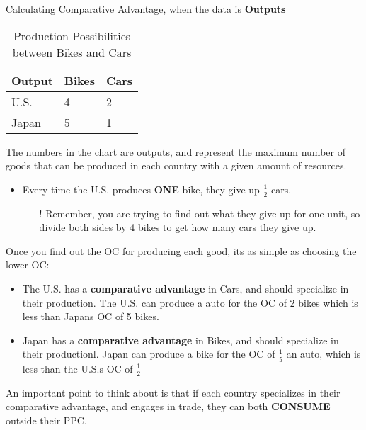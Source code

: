 \begin{example}
    Calculating Comparative Advantage, when the data is \textbf{Outputs}
    \begin{table}[h!]
        \begin{center}
            \begin{tabular}{l|l|l}
               \toprule
               \textbf{Output} & \textbf{Bikes} & \textbf{Cars}\\
               \midrule
               U.S. & 4 & 2\\
               Japan & 5 & 1\\
               \bottomrule
            \end{tabular}
            \caption{Production Possibilities between Bikes and Cars}
            \label{tab:table4}
        \end{center}
    \end{table}

The numbers in the chart are outputs, and represent the maximum number of goods that can be produced in each country with a given amount of resources. 
\begin{itemize}
    \item Every time the U.S. produces \textbf{ONE} bike, they give up $\frac{1}{2}$ cars.  
        \begin{itemize}
            \item[!] Remember, you are trying to find out what they give up for one unit, so divide both sides by 4 bikes to get how many cars they give up.
        \end{itemize}
\end{itemize}

Once you find out the OC for producing each good, its as simple as choosing the lower OC:
\begin{itemize}
    \item The U.S. has a \textbf{comparative advantage} in Cars, and should specialize in their production. The U.S. can produce a auto for the OC of 2 bikes which is less than Japans OC of 5 bikes. 
    \item Japan has a \textbf{comparative advantage} in Bikes, and should specialize in their productionl. Japan can produce a bike for the OC of $\frac{1}{5}$ an auto, which is less than the U.S.s OC of $\frac{1}{2}$
\end{itemize}
\end{example}
An important point to think about is that if each country specializes in their comparative advantage, and engages in trade, they can both \textbf{CONSUME} outside their PPC.
